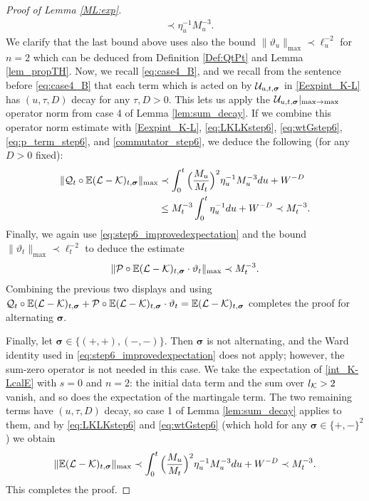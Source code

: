 \begin{proof}[Proof of Lemma \ref{ML:exp}]
\begin{align}
&\prec \eta_{u}^{-1}M_{u}^{-3}.\label{commutator_step6}
\end{align}
%
We clarify that the last bound above uses also the bound $\|\vartheta_{u}\|_{\max}\prec \ell_{u}^{-2}$ for $n=2$ which can be deduced from Definition \ref{Def:QtPt} and Lemma \ref{lem_propTH}. Now, we recall \eqref{eq:case4_B}, and we recall from the sentence before \eqref{eq:case4_B} that each term which is acted on by ${\cal U}_{u,t,\boldsymbol{\sigma}}$ in \eqref{Eexpint_K-L} has $(u,\tau,D)$ decay for any $\tau,D>0$. This lets us apply the ${\cal U}_{u,t,\boldsymbol{\sigma}}|_{\max\to\max}$ operator norm from case 4 of Lemma \ref{lem:sum_decay}. If we combine this operator norm estimate with \eqref{Eexpint_K-L}, \eqref{eq:LKLKstep6}, \eqref{eq:wtGstep6}, \eqref{eq:p_term_step6}, and \eqref{commutator_step6}, we deduce the following (for any $D>0$ fixed):
%
\begin{align*}
\|{\cal Q}_{t} \circ \mathbb{E}({\cal L}-{\cal K})_{t,\boldsymbol{\sigma}}\|_{\max}&\prec\int_{0}^{t}\Big(\frac{M_{u}}{M_{t}}\Big)^{2}\eta_{u}^{-1}M_{u}^{-3}du + W^{-D}\\
&\leq M_{t}^{-3}\int_{0}^{t}\eta_{u}^{-1}du+W^{-D}\prec M_{t}^{-3}.
\end{align*}
%
Finally, we again use \eqref{eq:step6_improvedexpectation} and the bound $\|\vartheta_{t}\|_{\max}\prec \ell_{t}^{-2}$ to deduce the estimate
%
\begin{align*}
\|{\cal P}\circ \mathbb{E}({\cal L}-{\cal K})_{t,\boldsymbol{\sigma}}\cdot\vartheta_{t}\|_{\max}\prec M_{t}^{-3}.
\end{align*}
%
Combining the previous two displays and using ${\cal Q}_{t}\circ \mathbb{E}({\cal L}-{\cal K})_{t,\boldsymbol{\sigma}}+{\cal P}\circ \mathbb{E}({\cal L}-{\cal K})_{t,\boldsymbol{\sigma}}\cdot\vartheta_{t}=\mathbb{E}({\cal L}-{\cal K})_{t,\boldsymbol{\sigma}}$ completes the proof for alternating $\boldsymbol{\sigma}$.

Finally, let $\boldsymbol{\sigma}\in\{(+,+),(-,-)\}$. Then $\boldsymbol{\sigma}$ is not alternating, and the Ward identity used in \eqref{eq:step6_improvedexpectation} does not apply; however, the sum-zero operator is not needed in this case. We take the expectation of \eqref{int_K-LcalE} with $s=0$ and $n=2$: the initial data term and the sum over $l_{\cal K}>2$ vanish, and so does the expectation of the martingale term. The two remaining terms have $(u,\tau,D)$ decay, so case 1 of Lemma \ref{lem:sum_decay} applies to them, and by \eqref{eq:LKLKstep6} and \eqref{eq:wtGstep6} (which hold for any $\boldsymbol{\sigma}\in\{+,-\}^{2}$) we obtain
\begin{align*}
\|\mathbb{E}({\cal L}-{\cal K})_{t,\boldsymbol{\sigma}}\|_{\max}\prec\int_{0}^{t}\Big(\frac{M_{u}}{M_{t}}\Big)^{2}\eta_{u}^{-1}M_{u}^{-3}du+W^{-D}\prec M_{t}^{-3}.
\end{align*}
This completes the proof.
\end{proof}




